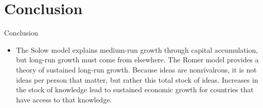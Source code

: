 \documentclass[10pt,aspectratio=169]{beamer}
\begin{document}
\section{Conclusion}
\begin{frame}{Conclusion}
    \begin{itemize}
        \item The Solow model explains medium-run growth through capital accumulation, but long-run growth must come from elsewhere.
        \itemvso The Romer model provides a theory of sustained long-run growth.
        \itemvso Because ideas are nonrivalrous, it is not ideas per person that matter, but rather this total stock of ideas.
        \itemvso Increases in the stock of knowledge lead to sustained economic growth for countries that have access to that knowledge.
    \end{itemize}
    
\end{frame}
\end{document}
